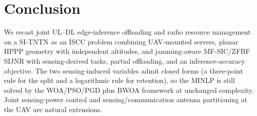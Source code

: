 \documentclass[journal]{IEEEtran}
\begin{document}
\section{Conclusion}
We recast joint UL--DL edge-inference offloading and radio resource management on a SI-TNTN as an ISCC problem combining UAV-mounted servers, planar HPPP geometry with independent altitudes, and jamming-aware MF-SIC/ZFBF SIJNR with sensing-derived tasks, partial offloading, and an inference-accuracy objective. The two sensing-induced variables admit closed forms (a three-point rule for the split and a logarithmic rule for retention), so the MINLP is still solved by the {WOA/PSO/PGD} plus BWOA framework at unchanged complexity. Joint sensing-power control and sensing/communication antenna partitioning at the UAV are natural extensions.



\end{document}

